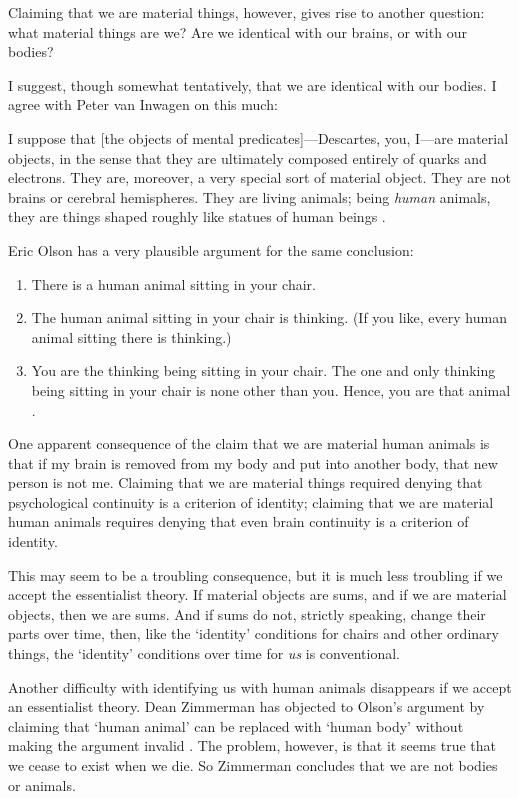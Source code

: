 \documentclass[11pt]{article}
\newenvironment{squote}{%
\begin{spacing}{1}
\begin{list}{}{%
\setlength{\labelwidth}{0pt}%
\rightmargin\leftmargin%
}
\item\relax
}{%
\end{list}%
\end{spacing}
}
\begin{document}
\begin{spacing}{1.5}
Claiming that we are material things, however, gives rise to another
question: what material things are we?  Are we identical with our
brains, or with our bodies?

I suggest, though somewhat tentatively, that we are identical with our
bodies.  I agree with Peter van Inwagen on this much:

\begin{squote}
I suppose that [the objects of mental predicates]---Descartes, you,
I---are material objects, in the sense that they are ultimately
composed entirely of quarks and electrons.  They are, moreover, a very
special sort of material object.  They are not brains or cerebral
hemispheres.  They are living animals; being {\em human} animals, they
are things shaped roughly like statues of human beings
\citeyearpar[6]{inwagen1995}.
\end{squote}

Eric Olson has a very plausible argument for the same conclusion:

\begin{enumerate}
  \item There is a human animal sitting in your chair.
  \item The human animal sitting in your chair is thinking. (If you
    like, every human animal sitting there is thinking.)
  \item You are the thinking being sitting in your chair. The one and
    only thinking being sitting in your chair is none other than
    you. Hence, you are that animal \citeyearpar[354]{olson2003a}.
\end{enumerate}

One apparent consequence of the claim that we are material human
animals is that if my brain is removed from my body and put into
another body, that new person is not me.  Claiming that we are
material things required denying that psychological continuity is a
criterion of identity; claiming that we are material human animals
requires denying that even brain continuity is a criterion of
identity.

This may seem to be a troubling consequence, but it is much less
troubling if we accept the essentialist theory.  If material objects
are sums, and if we are material objects, then we are sums.  And if
sums do not, strictly speaking, change their parts over time, then,
like the `identity' conditions for chairs and other ordinary things,
the `identity' conditions over time for {\em us} is conventional.

Another difficulty with identifying us with human animals disappears
if we accept an essentialist theory.  Dean Zimmerman has objected to
Olson's argument by claiming that `human animal' can be replaced with
`human body' without making the argument invalid
\citeyearpar[24]{zimmerman2008a}.  The problem, however, is that it
seems true that we cease to exist when we die.  So Zimmerman concludes
that we are not bodies or animals.


\end{spacing}
\end{document}
